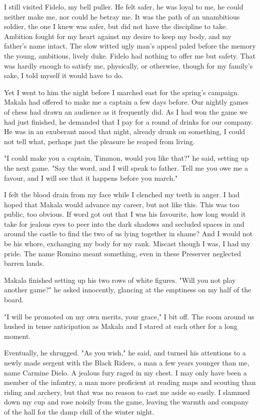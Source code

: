 \documentclass{article}
\begin{document}
I still visited Fidelo, my bell puller. He felt safer, he was loyal to me, he could neither make me, nor could he betray me. It was the path of an unambitious soldier, the one I knew was safer, but did not have the discipline to take. Ambition fought for my heart against my desire to keep my body, and my father's name intact. The slow witted ugly man's appeal paled before the memory the young, ambitious, lively duke. Fidelo had nothing to offer me but safety. That was hardly enough to satisfy me, physically, or otherwise, though for my family's sake, I told myself it would have to do. 

Yet I went to him the night before I marched east for the spring's campaign. Makala had offered to make me a captain a few days before. Our nightly games of chess had drawn an audience as it frequently did. As I had won the game we had just finished, he demanded that I pay for a round of drinks for our company. He was in an exuberant mood that night, already drunk on something, I could not tell what, perhaps just the pleasure he reaped from living. 

"I could make you a captain, Timmon, would you like that?" he said, setting up the next game. "Say the word, and I will speak to father. Tell me you owe me a favour, and I will see that it happens before you march." 

I felt the blood drain from my face while I clenched my teeth in anger. I had hoped that Makala would advance my career, but not like this. This was too public, too obvious. If word got out that I was his favourite, how long would it take for jealous eyes to peer into the dark shadows and secluded spaces in and around the castle to find the two of us lying together in shame? And I would not be his whore, exchanging my body for my rank. Miscast though I was, I had my pride. The name Romino meant something, even in these Preserver neglected barren lands.

Makala finished setting up his two rows of white figures. "Will you not play another game?" he asked innocently, glancing at the emptiness on my half of the board.

"I will be promoted on my own merits, your grace," I bit off. The room around us hushed in tense anticipation as Makala and I stared at each other for a long moment. 

Eventually, he shrugged. "As you wish," he said, and turned his attentions to a newly made sergent with the Black Riders, a man a few years younger than me, name Carmine Dielo. A jealous fury raged in my chest. I may only have been a member of the infantry, a man more proficient at reading maps and scouting than riding and archery, but that was no reason to cast me aside so easily. I slammed down my cup and rose noisily from the game, leaving the warmth and company of the hall for the damp chill of the winter night.
\end{document}
